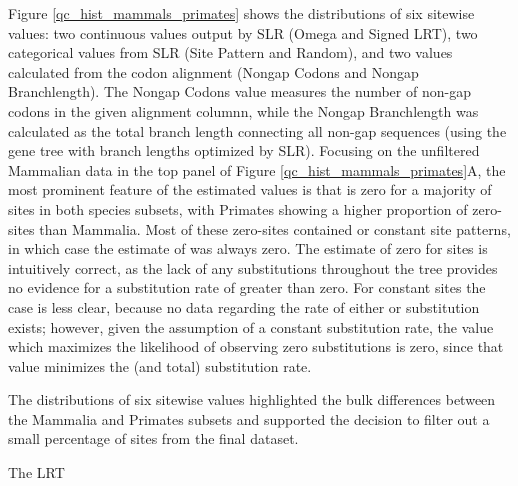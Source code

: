 Figure \ref{qc_hist_mammals_primates} shows the distributions of six
sitewise values: two continuous values output by SLR (Omega and Signed
LRT), two categorical values from SLR (Site Pattern and Random), and
two values calculated from the codon alignment (Nongap Codons and
Nongap Branchlength). The Nongap Codons value measures the number of
non-gap codons in the given alignment columnn, while the Nongap
Branchlength was calculated as the total branch length connecting all
non-gap sequences (using the gene tree with branch lengths optimized
by SLR). Focusing on the unfiltered Mammalian data in the top panel of
Figure \ref{qc_hist_mammals_primates}A, the most prominent feature of
the estimated \omg values is that \omg is zero for a majority of sites
in both species subsets, with Primates showing a higher proportion of
zero-\omg sites than Mammalia. Most of these zero-\omg sites contained
\syn or constant site patterns, in which case the \ml estimate of \omg
was always zero. The estimate of zero for \syn sites is intuitively
correct, as the lack of any \nsyn substitutions throughout the tree
provides no evidence for a \nsyn substitution rate of greater than
zero. For constant sites the case is less clear, because no data
regarding the rate of either \syn or \nsyn substitution exists;
however, given the assumption of a constant \syn substitution rate,
the \omg value which maximizes the likelihood of observing zero
substitutions is zero, since that value minimizes the \nsyn (and
total) substitution rate.

The distributions of six sitewise values highlighted the bulk
differences between the Mammalia and Primates subsets and supported
the decision to filter out a small percentage of sites from the final
dataset.

The LRT 

